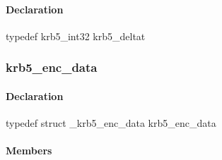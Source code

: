 \documentclass[letterpaper,10pt,english]{sphinxmanual}
\begin{document}
\begin{fulllineitems}
\label{appdev/refs/types/krb5_deltat:c.krb5_deltat}
\end{fulllineitems}



\paragraph{Declaration}
\label{appdev/refs/types/krb5_deltat:declaration}
typedef krb5\_int32 krb5\_deltat


\subsubsection{krb5\_enc\_data}
\label{appdev/refs/types/krb5_enc_data::doc}\label{appdev/refs/types/krb5_enc_data:krb5-enc-data}\label{appdev/refs/types/krb5_enc_data:krb5-enc-data-struct}

\begin{fulllineitems}
\label{appdev/refs/types/krb5_enc_data:c.krb5_enc_data}
\end{fulllineitems}



\paragraph{Declaration}
\label{appdev/refs/types/krb5_enc_data:declaration}
typedef struct \_krb5\_enc\_data  krb5\_enc\_data


\paragraph{Members}
\label{appdev/refs/types/krb5_enc_data:members}

\begin{fulllineitems}
\label{appdev/refs/types/krb5_enc_data:c.krb5_enc_data.magic}
\end{fulllineitems}


\begin{fulllineitems}
\label{appdev/refs/types/krb5_enc_data:c.krb5_enc_data.enctype}
\end{fulllineitems}
\end{document}

